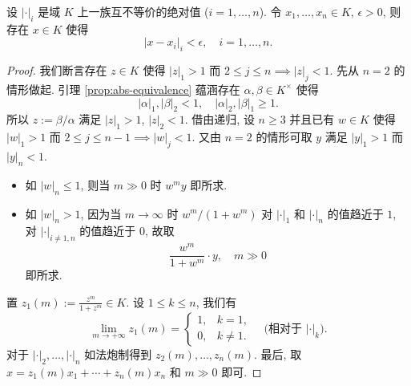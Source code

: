 \begin{theorem}\label{prop:AW-approx}
	设 $|\cdot|_i$ 是域 $K$ 上一族互不等价的绝对值 ($i=1,\ldots,n$). 令 $x_1, \ldots, x_n \in K$, $\epsilon > 0$, 则存在 $x \in K$ 使得
	\[ |x-x_i|_i  < \epsilon, \quad i=1,\ldots,n. \]
\end{theorem}
\begin{proof}
	我们断言存在 $z \in K$ 使得 $|z|_1 > 1$ 而 $2 \leq j \leq n \implies |z|_j < 1$. 先从 $n=2$ 的情形做起. 引理 \ref{prop:abs-equivalence} 蕴涵存在 $\alpha, \beta \in K^\times$ 使得
	\[ |\alpha|_1, |\beta|_2 < 1, \quad |\alpha|_2, |\beta|_1 \geq 1. \]
	所以 $z := \beta/\alpha$ 满足 $|z|_1 > 1$, $|z|_2 < 1$. 借由递归, 设 $n \geq 3$ 并且已有 $w \in K$ 使得 $|w|_1 > 1$ 而 $2 \leq j \leq n-1 \implies |w|_j < 1$. 又由 $n=2$ 的情形可取 $y$ 满足 $|y|_1 > 1$ 而 $|y|_n < 1$.
	\begin{itemize}
		\item 如 $|w|_n \leq 1 $, 则当 $m \gg 0$ 时 $w^m y$ 即所求.
		\item 如 $|w|_n > 1$, 因为当 $m \to \infty$ 时 $w^m/(1+w^m)$ 对 $|\cdot|_1$ 和 $|\cdot|_n$ 的值趋近于 $1$, 对 $|\cdot|_{i \neq 1,n}$ 的值趋近于 $0$, 故取
			\[ \frac{w^m}{1+w^m} \cdot y, \quad m \gg 0\]
			即所求.
	\end{itemize}
	置 $z_1(m) := \frac{z^m}{1+z^m} \in K$. 设 $1 \leq k \leq n$, 我们有
	\[ \lim_{m \to +\infty} z_1(m) = \begin{cases}
		1, & k = 1, \\
		0, & k \neq 1.
	\end{cases} \quad \text{(相对于 $|\cdot|_k$)}. \]
	对于 $|\cdot|_2, \ldots, |\cdot|_n$ 如法炮制得到 $z_2(m), \ldots, z_n(m)$. 最后, 取 $x = z_1(m) x_1 + \cdots + z_n(m) x_n$ 和 $m \gg 0$ 即可.
\end{proof}

